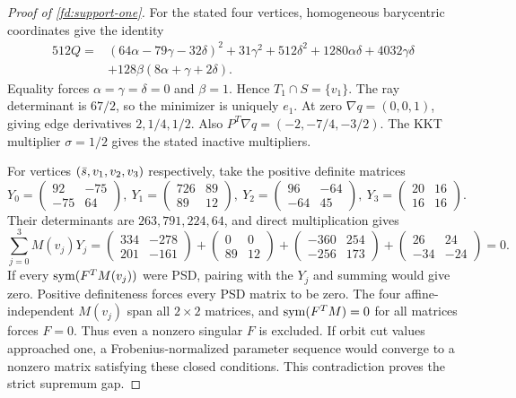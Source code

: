 \begin{proof}[Proof of \cref{fd:support-one}]
\label{fd:support-one-proof}
For the stated four vertices, homogeneous
barycentric coordinates give the identity
\begin{align*}
512Q={}&(64\alpha-79\gamma-32\delta)^2
       +31\gamma^2+512\delta^2+1280\alpha\delta
       +4032\gamma\delta\\
      &+128\beta(8\alpha+\gamma+2\delta).
\end{align*}
Equality forces $\alpha=\gamma=\delta=0$ and
$\beta=1$. Hence $T_1\cap S=\{v_1\}$.
The ray determinant is $67/2$, so the minimizer
is uniquely $e_1$.
At zero $\nabla q=(0,0,1)$, giving edge derivatives
$2,1/4,1/2$. Also
$P^T\nabla q=(-2,-7/4,-3/2)$.
The KKT multiplier $\sigma=1/2$ gives the stated
inactive multipliers.

For vertices $(\bar s,v_1,v_2,v_3)$ respectively,
take the positive definite matrices
\[
 Y_0=\begin{pmatrix}92&-75\\-75&64\end{pmatrix},\
 Y_1=\begin{pmatrix}726&89\\89&12\end{pmatrix},\
 Y_2=\begin{pmatrix}96&-64\\-64&45\end{pmatrix},\
 Y_3=\begin{pmatrix}20&16\\16&16\end{pmatrix}.
\]
Their determinants are $263,791,224,64$, and
direct multiplication gives
\[
 \sum_{j=0}^3 M(v_j)Y_j
 =\begin{pmatrix}334&-278\\201&-161\end{pmatrix}
 +\begin{pmatrix}0&0\\89&12\end{pmatrix}
 +\begin{pmatrix}-360&254\\-256&173\end{pmatrix}
 +\begin{pmatrix}26&24\\-34&-24\end{pmatrix}=0.
\]
If every $\operatorname{sym}(F^TM(v_j))$ were PSD, pairing
with the $Y_j$ and summing would give zero.
Positive definiteness forces every PSD matrix
to be zero. The four affine-independent
$M(v_j)$ span all $2\times2$ matrices, and
$\operatorname{sym}(F^TM)=0$ for all matrices forces $F=0$.
Thus even a nonzero singular $F$ is excluded.
If orbit cut values approached one, a
Frobenius-normalized parameter sequence would
converge to a nonzero matrix satisfying these
closed conditions. This contradiction proves
the strict supremum gap.
\end{proof}

